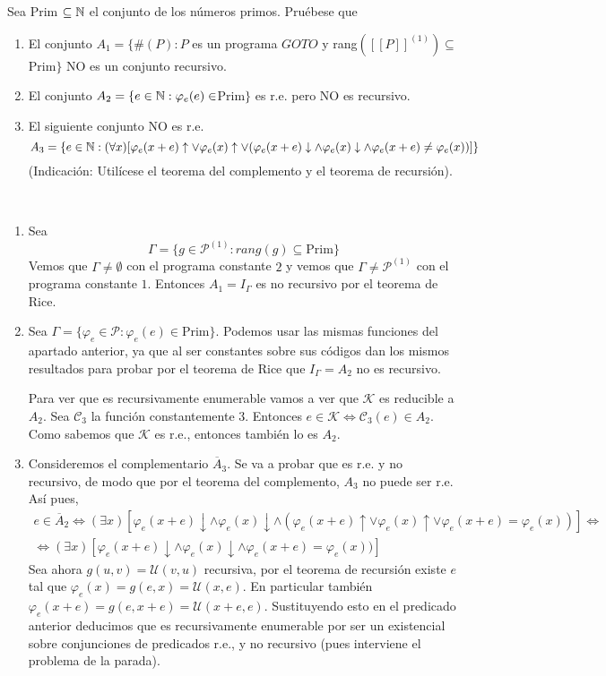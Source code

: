 \documentclass[11pt]{article}
\let \sii \Leftrightarrow
\begin{document}
\begin{ejercicio}{2}
Sea Prim $\subseteq \mathbb{N}$ el conjunto de los números primos. Pruébese que
\begin{enumerate}
\item El conjunto $A_1 = \{\#(P) : P$ es un programa $GOTO$ y rang$([\![P]\!]^{(1)})\subseteq$Prim$\}$ NO es un conjunto recursivo.
\item El conjunto $A_2 = \{e \in \mathbb{N} : \varphi_e(e)\in$Prim$\}$ es r.e. pero NO es recursivo.
\item El siguiente conjunto NO es r.e.
$$A_3 = \{e \in \mathbb{N} : (\forall x) [\varphi_e(x + e)\uparrow\lor \varphi_e(x)\uparrow \lor(\varphi_e(x + e)\downarrow \land \varphi_e(x)\downarrow \land \varphi_e(x + e) \neq \varphi_e(x))]\}$$
(Indicación: Utilícese el teorema del complemento y el teorema de recursión).
\end{enumerate}
\end{ejercicio}
\begin{solucion}\
\begin{enumerate}
	\item Sea
	\[  Γ = \{g \in \mathcal{P}^{(1)} : rang(g) \subseteq \text{Prim}\} \]
	Vemos que $Γ \neq \emptyset$ con el programa constante $2$ y vemos que $Γ \neq \mathcal{P}^{(1)}$ con el programa constante $1$. Entonces $A_1 = I_Γ$ es no recursivo por el teorema de Rice.
	
	\item Sea $\Gamma=\{ \varphi_e\in\mathcal{P}: \varphi_e(e)\in$Prim$\}$. Podemos usar las mismas funciones del apartado anterior, ya que al ser constantes sobre sus códigos dan los mismos resultados para probar por el teorema de Rice que $I_{\Gamma}=A_2$ no es recursivo.
	
	Para ver que es recursivamente enumerable vamos a ver que $\mathcal{K}$ es reducible a $A_2$. Sea $\mathcal{C}_3$ la función constantemente 3. Entonces $e\in\mathcal{K}\Leftrightarrow \mathcal{C}_3(e)\in A_2$. Como sabemos que $\mathcal{K}$ es r.e., entonces también lo es $A_2$. 
	
	\item Consideremos el complementario $\overline{A}_3$. Se va a probar que es r.e. y no recursivo, de modo que por el teorema del complemento, $A_3$ no puede ser r.e. Así pues, 
\begin{gather*}
e\in\overline{A}_2\sii (\exists x)[\varphi_e(x+e)\downarrow\land\varphi_e(x)\downarrow\land(\varphi_e(x+e)\uparrow\lor\varphi_e(x)\uparrow\lor \varphi_e(x+e)=\varphi_e(x))]\sii\\
\sii (\exists x)[\varphi_e(x+e)\downarrow\land\varphi_e(x)\downarrow\land\varphi_e(x+e)=\varphi_e(x))]
\end{gather*}
Sea ahora $g(u,v)=\mathcal{U}(v,u)$ recursiva, por el teorema de recursión existe $e$ tal que $\varphi_e(x)=g(e,x)=\mathcal{U}(x,e)$. En particular también $\varphi_e(x+e)=g(e,x+e)=\mathcal{U}(x+e,e)$. Sustituyendo esto en el predicado anterior deducimos que es recursivamente enumerable por ser un existencial sobre conjunciones de predicados r.e., y no recursivo (pues interviene el problema de la parada).
\end{enumerate}
\end{solucion}
\end{document}
